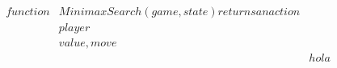 \documentclass[preview]{standalone}
\begin{document}
\begin{align*}
function &MinimaxSearch(game, state) returns an action \\&player \\& value, move \\&&hola
\end{align*}
\end{document}
